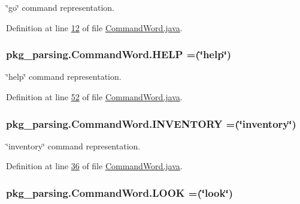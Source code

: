 \char`\"{}go\char`\"{} command representation. 



Definition at line \hyperlink{CommandWord_8java_source_l00012}{12} of file \hyperlink{CommandWord_8java_source}{Command\-Word.\-java}.

\hypertarget{enumpkg__parsing_1_1CommandWord_ace035a3a624f4247b9f38c24eabe3f91}{
\subsubsection[{H\-E\-L\-P}]{\setlength{\rightskip}{0pt plus 5cm}pkg\-\_\-parsing.\-Command\-Word.\-H\-E\-L\-P =(\char`\"{}help\char`\"{})}}\label{enumpkg__parsing_1_1CommandWord_ace035a3a624f4247b9f38c24eabe3f91}


\char`\"{}help\char`\"{} command representation. 



Definition at line \hyperlink{CommandWord_8java_source_l00052}{52} of file \hyperlink{CommandWord_8java_source}{Command\-Word.\-java}.

\hypertarget{enumpkg__parsing_1_1CommandWord_a3dace936c35682fe74dad6714af270e4}{
\subsubsection[{I\-N\-V\-E\-N\-T\-O\-R\-Y}]{\setlength{\rightskip}{0pt plus 5cm}pkg\-\_\-parsing.\-Command\-Word.\-I\-N\-V\-E\-N\-T\-O\-R\-Y =(\char`\"{}inventory\char`\"{})}}\label{enumpkg__parsing_1_1CommandWord_a3dace936c35682fe74dad6714af270e4}


\char`\"{}inventory\char`\"{} command representation. 



Definition at line \hyperlink{CommandWord_8java_source_l00036}{36} of file \hyperlink{CommandWord_8java_source}{Command\-Word.\-java}.

\hypertarget{enumpkg__parsing_1_1CommandWord_a56f571b76d6ef6d6c64f9b2081b53e86}{
\subsubsection[{L\-O\-O\-K}]{\setlength{\rightskip}{0pt plus 5cm}pkg\-\_\-parsing.\-Command\-Word.\-L\-O\-O\-K =(\char`\"{}look\char`\"{})}}\label{enumpkg__parsing_1_1CommandWord_a56f571b76d6ef6d6c64f9b2081b53e86}


